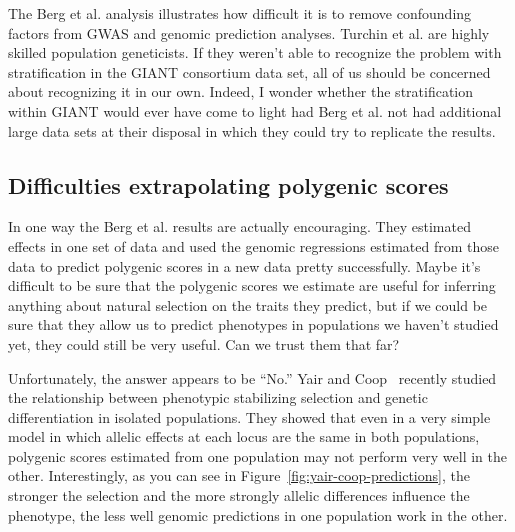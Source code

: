 The Berg et al. analysis illustrates how difficult it is to remove
confounding factors from GWAS and genomic prediction
analyses. Turchin et al. are highly skilled population geneticists. If
they weren't able to recognize the problem with stratification in the
GIANT consortium data set, all of us should be concerned about
recognizing it in our own. Indeed, I wonder whether the stratification
within GIANT would ever have come to light had Berg et al. not had
additional large data sets at their disposal in which they could try
to replicate the results.

\subsection*{Difficulties extrapolating polygenic scores}

In one way the Berg et al. results are actually encouraging. They
estimated effects in one set of data and used the genomic regressions
estimated from those data to predict polygenic scores in a new data
pretty successfully. Maybe it's difficult to be sure that the
polygenic scores we estimate are useful for inferring anything about
natural selection on the traits they predict, but if we could be sure
that they allow us to predict phenotypes in populations we haven't
studied yet, they could still be very useful. Can we trust them that
far?

Unfortunately, the answer appears to be ``No.'' Yair and
Coop~\cite{Yair-Coop-2021} recently studied the relationship between
phenotypic stabilizing selection and genetic differentiation in
isolated populations. They showed that even in a very simple model in
which allelic effects at each locus are the same in both populations,
polygenic scores estimated from one population may not perform very
well in the other. Interestingly, as you can see in
Figure~\ref{fig:yair-coop-predictions}, the stronger the selection and
the more strongly allelic differences influence the phenotype, the less
well genomic predictions in one population work in the other.

